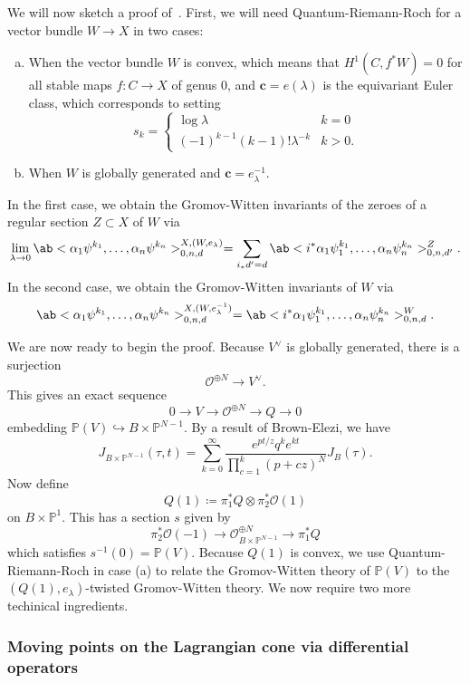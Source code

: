 \documentclass[leqno, openany]{memoir}
\theoremstyle{definition}
\theoremstyle{remark}
\theoremstyle{plain}
\theoremstyle{definition}
\theoremstyle{remark}
\renewcommand{\P}{\mathbb{P}}
\newcommand{\mc}[1]{\mathcal{#1}}
\newcommand{\mbf}[1]{\mathbf{#1}}
\begin{document}
We will now sketch a proof of~. First, we will need Quantum-Riemann-Roch for a vector bundle $W \to X$ in two cases:
\begin{enumerate}[(a)]
    \item When the vector bundle $W$ is convex, which means that $H^1(C, f^*W) = 0$ for all stable maps $f \colon C \to X$ of genus $0$, and $\mbf{c} = e(\lambda)$ is the equivariant Euler class, which corresponds to setting
        \[ s_k = \begin{cases}
            \log \lambda & k=0 \\
            (-1)^{k-1} (k-1)! \lambda^{-k} & k > 0 .
        \end{cases}
        \]
    \item When $W$ is globally generated and $\mbf{c} = e_{\lambda}^{-1}$.
\end{enumerate}

In the first case, we obtain the Gromov-Witten invariants of the zeroes of a regular section $Z \subset X$ of $W$ via
\[ \lim_{\lambda \to 0} \ab< \alpha_1 \psi^{k_1},\ldots,\alpha_n \psi^{k_n}>_{0,n,d}^{X,(W,e_{\lambda})} = \sum_{i_* d' = d} \ab<i^* \alpha_1 \psi_1^{k_1},\ldots,\alpha_n \psi_n^{k_n}>_{0,n,d'}^Z. \]
In the second case, we obtain the Gromov-Witten invariants of $W$ via
\[ \ab< \alpha_1 \psi^{k_1},\ldots,\alpha_n \psi^{k_n}>_{0,n,d}^{X,(W,e_{\lambda}^{-1})} = \ab<i^* \alpha_1 \psi_1^{k_1},\ldots,\alpha_n \psi_n^{k_n}>_{0,n,d}^W. \]

We are now ready to begin the proof. Because $V^{\vee}$ is globally generated, there is a surjection
\[ \mc{O}^{\oplus N} \to V^{\vee}. \]
This gives an exact sequence
\[ 0 \to V \to \mc{O}^{\oplus N} \to Q \to 0 \]
embedding $\P(V) \hookrightarrow B \times \P^{N-1}$. By a result of Brown-Elezi, we have
\[ J_{B \times \P^{N-1}}(\tau, t) = \sum_{k=0}^{\infty} \frac{e^{pt/z} q^k e^{kt}}{\prod_{c=1}^k (p+cz)^N} J_B(\tau). \]
Now define
\[ Q(1) \coloneqq \pi_1^* Q \otimes \pi_2^* \mc{O}(1) \]
on $B \times \P^1$. This has a section $s$ given by
\[ \pi_2^* \mc{O}(-1) \to \mc{O}_{B \times \P^{N-1}}^{\oplus N} \to \pi_1^* Q \]
which satisfies $s^{-1}(0) = \P(V)$. Because $Q(1)$ is convex, we use Quantum-Riemann-Roch in case (a) to relate the Gromov-Witten theory of $\P(V)$ to the $(Q(1), e_{\lambda})$-twisted Gromov-Witten theory. We now require two more techinical ingredients.

\subsubsection{Moving points on the Lagrangian cone via differential operators}%
\label{ssub:Moving points on the Lagrangian cone via differential operators}
\end{document}
